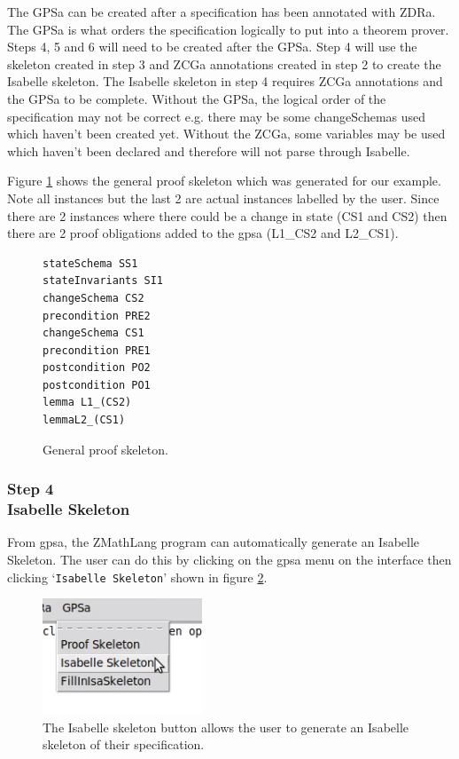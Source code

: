 The GPSa can be created after a specification has been annotated with ZDRa. The GPSa is what orders the specification 
logically to put into a theorem prover. Steps 4, 5 and 6 will need to be created after the GPSa. Step 4 will use the skeleton 
created in step 3 and ZCGa annotations created in step 2 to create the Isabelle skeleton. The Isabelle skeleton in
step 4 requires ZCGa annotations and the GPSa to be complete. Without the GPSa, the logical order of the specification may not be correct
e.g. there may be some changeSchemas used which haven't been created yet. Without the ZCGa, some variables may be used which haven't been 
declared and therefore will not parse through Isabelle.

Figure \ref{fig:gpsaFullexample} shows the general proof skeleton which was
generated for our example. Note all instances but the last 2 are actual
instances labelled by the user. Since there are 2 instances where there could be
a change in state (CS1 and CS2) then there are 2 proof obligations added to the
\gls{gpsa} (L1\_CS2 and L2\_CS1).

\begin{figure}[H]
\centering
\begin{scriptsize}
\begin{BVerbatim}
stateSchema SS1
stateInvariants SI1
changeSchema CS2
precondition PRE2
changeSchema CS1
precondition PRE1
postcondition PO2
postcondition PO1
lemma L1_(CS2)
lemmaL2_(CS1) 
\end{BVerbatim}
\end{scriptsize}
\caption{General proof skeleton. \label{fig:gpsaFullexample}}
\end{figure}

\subsubsection{Step 4\\Isabelle Skeleton}

From \gls{gpsa}, the ZMathLang program can automatically generate an Isabelle
Skeleton. The user can do this by clicking on the \gls{gpsa} menu on the
interface then clicking `\texttt{Isabelle Skeleton}' shown in figure
\ref{fig:isabutton}.

\begin{figure}[H]
\centering
\includegraphics[scale=1]{Figures/fullexample/isaskelbutton.png}
\caption{The Isabelle skeleton button allows the user to generate an Isabelle skeleton of their specification. \label{fig:isabutton}}
\end{figure}

